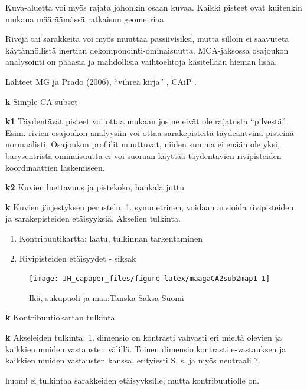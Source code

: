 \documentclass[
  finnish,
]{book}
\begin{document}
Kuva-aluetta voi myös rajata johonkin osaan kuvaa. Kaikki pisteet ovat kuitenkin
mukana määräämässä ratkaisun geometriaa.

Rivejä tai sarakkeita voi myös muuttaa passiivisiksi, mutta silloin ei saavuteta
käytännöllistä inertian dekomponointi-ominaisuutta. MCA-jaksossa osajoukon
analysointi on pääasia ja mahdollisia vaihtoehtoja käsitellään hieman lisää.

Lähteet MG ja Prado (2006)\citep{RefWorks:doc:5a857a44e4b0ed2d44664d87},
``vihreä kirja'' \citep{RefWorks:doc:5ab76b43e4b003f4468d1f07},
CAiP \citep{RefWorks:doc:5a857a43e4b0ed2d44664d78}.

\textbf{k} Simple CA subset

\textbf{k1} Täydentävät pisteet voi ottaa mukaan jos ne eivät ole rajatusta ``pilvestä''.
Esim. rivien osajoukon analyysiin voi ottaa sarakepisteitä täydeäntvinä pisteinä
normaalisti. Osajoukon profiilit muuttuvat, niiden summa ei enään ole yksi,
barysentristä ominaisuutta ei voi suoraan käyttää täydentävien rivipisteiden
koordinaattien laskemiseen.

\textbf{k2} Kuvien luettavuus ja pistekoko, hankala juttu

\textbf{k} Kuvien järjestyksen perustelu. 1. symmetrinen, voidaan arvioida rivipisteiden
ja sarakepisteiden etäisyyksiä. Akselien tulkinta.

\begin{enumerate}
\def\labelenumi{\arabic{enumi}.}
\setcounter{enumi}{1}
\item
  Kontribuutikartta: laatu, tulkinnan tarkentaminen
\item
  Rivipisteiden etäisyydet - siksak
\end{enumerate}

\begin{figure}

{\centering \texttt{[image: JH\_capaper\_files/figure-latex/maagaCA2sub2map1-1]} 

}

\caption{Ikä, sukupuoli ja maa:Tanska-Saksa-Suomi}\label{fig:maagaCA2sub2map1}
\end{figure}

\textbf{k} Kontribuutiokartan tulkinta

\textbf{k} Akseleiden tulkinta: 1. dimensio on kontrasti vahvasti eri mieltä olevien
ja kaikkien muiden vastausten välillä. Toinen dimensio kontrasti e-vastauksen
ja kaikkien muiden vastausten kanssa, erityiesti S, s, ja myös neutraali ?.

huom! ei tulkintaa sarakkeiden etäisyyksille, mutta kontribuutiolle on.
\end{document}

